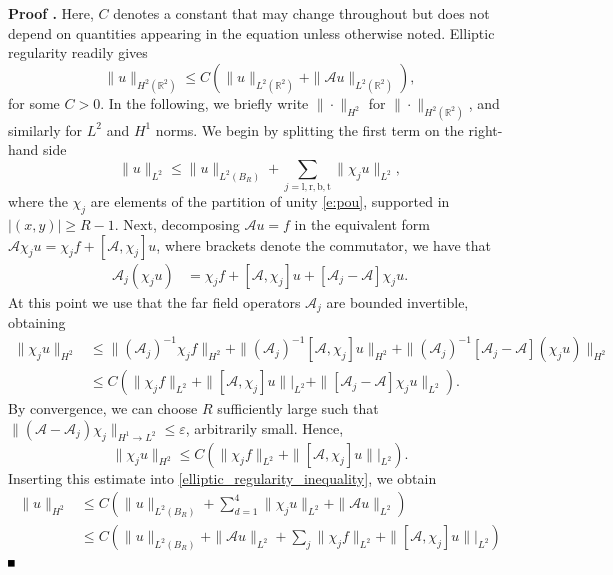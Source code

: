 \documentclass[10pt]{article}
\newenvironment{Proof}[1][\unskip]%
 {\begin{trivlist} \item[]{\bf Proof #1. }}%
 {\hspace*{\fill}$\rule{.4\baselineskip}{.4\baselineskip}$\end{trivlist}}
\renewcommand{\leq}{\leqslant}
\renewcommand{\geq}{\geqslant}
\begin{document}
\begin{Proof}
Here, $C$ denotes a constant that may change throughout but does not depend on quantities appearing in the equation unless otherwise noted. Elliptic regularity readily gives 
%
\begin{equation}\label{elliptic_regularity_inequality}
\|u \|_{H^2(\mathbb{R}^2)} \leq C( \| u\|_{L^2(\mathbb{R}^2)} + \|\mathcal{A}u \|_{L^2(\mathbb{R}^2)}),
\end{equation}
%
for some $C>0$. In the following, we briefly write  $\|\cdot\|_{H^2}$ for $\|\cdot\|_{H^2(\mathbb{R}^2)}$, and similarly for $L^2$ and $H^1$ norms. We begin by splitting the first term on the right-hand side 
\[
\| u\|_{L^2} \leq \| u\|_{L^2(B_R)} + \sum_{j= \mathrm{l,r,b,t}}\|\chi_j u\|_{L^2},
\]
where the $\chi_j$ are elements of the partition of unity \eqref{e:pou}, supported in $|(x,y)|\geq R-1$. Next, decomposing $\mathcal{A}u = f$ in the equivalent form $\mathcal{A} \chi_j u = \chi_j f + [\mathcal{A}, \chi_j]u$, where brackets denote the commutator,  we have that 
%
\begin{align*}
\mathcal{A}_j(\chi_ju) &= \chi_jf + [\mathcal{A}, \chi_j]u  +  [\mathcal{A}_j - \mathcal{A}]\chi_ju.
\end{align*}
%
At this point we use that the far field operators $\mathcal{A}_j$ are bounded invertible, obtaining
%
\begin{align*}
\|\chi_ju\|_{H^2} &\leq \|\left(\mathcal{A}_j\right)^{-1}\chi_jf\|_{H^2} + \|\left(\mathcal{A}_j\right)^{-1}[\mathcal{A}, \chi_j]u\|_{H^2}  +  \|\left(\mathcal{A}_j\right)^{-1}[\mathcal{A}_j - \mathcal{A}](\chi_ju)\|_{H^2} \nonumber \\
& \leq C\left(\|\chi_j f\|_{L^2} +\|[\mathcal{A}, \chi_j]u\||_{L^2} + \|[\mathcal{A}_j - \mathcal{A}]\chi_ju\|_{L^2} \right).
\end{align*}
By convergence, we can choose $R$ sufficiently large such that $\|(\mathcal{A}-\mathcal{A}_j)\chi_j\|_{H^1\to L^2}\leq \varepsilon$, arbitrarily small.
%
Hence,  
\[
 \|\chi_j u\|_{H^2} \leq C \left( \|\chi_j f\|_{L^2} +\|[\mathcal{A}, \chi_j]u\||_{L^2}\right).
 \]
%
Inserting this estimate into  \eqref{elliptic_regularity_inequality}, we obtain
\begin{align}\label{almost_final_equation_elliptic_regularity_inequ}
\|u \|_{H^2} &\leq C\left( \| u\|_{L^2(B_R)} + \sum_{d=1}^4\|\chi_j u\|_{L^2} + \|\mathcal{A}u \|_{L^2} \right)\nonumber\\
&\leq  C\left(\| u\|_{L^2(B_R)} + \|\mathcal{A}u \|_{L^2} + \sum_j \|\chi_j f\|_{L^2} +\|[\mathcal{A}, \chi_j]u\||_{L^2}\right) \nonumber\\

\end{align}
\end{Proof}
\end{document}
